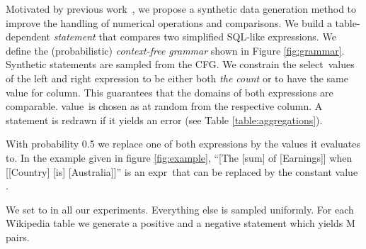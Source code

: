 \documentclass[11pt,a4paper]{article}
\newcommand\la{}  \newcommand\ra{}
\theoremstyle{definition}
\begin{document}
\begin{table}[!t]
\centering
{}
\caption{Aggregations used in synthetic statements, where  are the column values. When  is empty or a singleton, it results in an error. Numeric functions also fail if any of their values is non-numeric.}
\label{table:aggregations}
\end{table}

Motivated by previous work~\cite{Geva2020InjectingNR}, we propose a synthetic data generation method to improve the handling of numerical operations and comparisons.
We build a table-dependent \emph{statement} that compares two simplified SQL-like expressions.
We define the (probabilistic) \emph{context-free grammar} shown in Figure \ref{fig:grammar}.
Synthetic statements are sampled from the CFG.
We constrain the  \la select\ra~values of the left and right expression to be either both \emph{the count} or to have the same value for \la column\ra.
This guarantees that the domains of both expressions are comparable.
\la value\ra~is chosen as at random from the respective column.
A statement is redrawn if it yields an error (see Table \ref{table:aggregations}).

With probability 0.5 we replace one of both expressions by the values it evaluates to.
In the example given in figure \ref{fig:example}, ``[The [sum] of [Earnings]] when [[Country] [is] [Australia]]'' is an \la expr\ra~that can be replaced by the constant value .

We set  to  in all our experiments. Everything else is sampled uniformly. 
For each Wikipedia table we generate a positive and a negative statement which yields M pairs.
\end{document}
